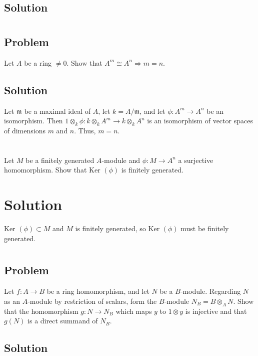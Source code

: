 \documentclass[book,12pt,oneside,openany]{memoir}
\begin{document}
\subsection{Solution}

\section{}
\subsection{Problem}
Let $A$ be a ring $\neq 0$. Show that $A^m \cong A^n \Rightarrow m = n$.

\subsection{Solution}
Let $\mathfrak{m}$ be a maximal ideal of $A$, let $k = A/\mathfrak{m}$, and let $\phi: A^m \rightarrow A^n$ be an isomorphism. Then $1 \otimes_k \phi: k \otimes_k A^m \rightarrow k \otimes_k A^n$ is an isomorphism of vector spaces of dimensions $m$ and $n$. Thus, $m = n$.

\section{}
Let $M$ be a finitely generated $A$-module and $\phi: M \rightarrow A^n$ a surjective homomorphism. Show that Ker $(\phi)$ is finitely generated.

\section{Solution}
Ker $(\phi) \subset M$ and $M$ is finitely generated, so Ker $(\phi)$ must be finitely generated.

\section{}
\subsection{Problem}
Let $f: A \rightarrow B$ be a ring homomorphism, and let $N$ be a $B$-module. Regarding $N$ as an $A$-module by restriction of scalars, form the $B$-module $N_B = B \otimes_A N$. Show that the homomorphism $g: N \rightarrow N_B$ which maps $y$ to $1 \otimes y$ is injective and that $g(N)$ is a direct summand of $N_B$.

\subsection{Solution}
\end{document}
